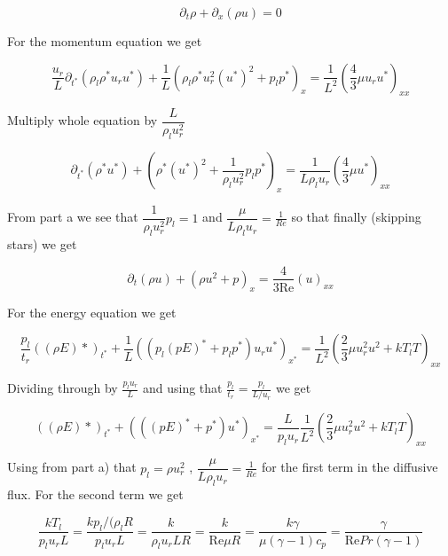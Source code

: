 \documentclass{article}
\renewcommand{\Re}{\text{Re}}
\begin{document}
\begin{equation}
 	\partial_t\rho + \partial_x(\rho u) = 0
\end{equation}

For the momentum equation we get

\begin{equation}
\frac{u_r}{L}\partial_{t^*}(\rho_l\rho^* u_r u^*) + \frac{1}{L}(\rho_l \rho^* u_r^2 (u^*)^2 + p_l p^*)_x = \frac{1}{L^2}(\frac{4}{3}\mu u_r u^*)_{xx}
\end{equation}


Multiply whole equation by $\dfrac{L}{\rho_l u_r^2}$

\begin{equation}
\partial_{t^*}(\rho^*  u^*) + ( \rho^*  (u^*)^2 + \dfrac{1}{\rho_l u_r^2}p_l p^*)_x = \dfrac{1}{L \rho_l u_r}(\frac{4}{3}\mu u^*)_{xx}
\end{equation}

From part a we see that $\dfrac{1}{\rho_l u_r^2}p_l=1$ and $ \dfrac{\mu}{L \rho_l u_r} = \frac{1}{Re}$  so that finally (skipping stars) we get

\begin{equation}
\partial_{t}(\rho  u) + ( \rho  u^2 +  p)_x = \frac{4}{3 \Re}( u)_{xx}
\end{equation}

For the energy equation we get

\begin{equation}
\frac{p_l}{t_r} ((\rho E)*)_{t^*} + \frac{1}{L} ( (p_l(pE)^*+p_l p^*)u_r u^*  )_{x^*} = \frac{1}{L^2} (\frac{2}{3}\mu u_r^2 u^2 + k T_l T)_{xx}
\end{equation}

Dividing through by $\frac{p_l u_r}{L}$ and using that $\frac{p_l}{t_r} = \frac{p_l}{L/u_r}$ we get


\begin{equation}
 ((\rho E)*)_{t^*} +  ( ((pE)^*+p^*)u^*  )_{x^*} = \frac{L}{p_l u_r} \frac{1}{L^2} (\frac{2}{3}\mu u_r^2 u^2 + k T_l T)_{xx}
\end{equation}

Using from part a) that $p_l = \rho u_r^2$ , $ \dfrac{\mu}{L \rho_l u_r} = \frac{1}{Re}$ for the first term in the diffusive flux. For the second term we get

\begin{equation}
\frac{kT_l}{p_l u_r L} =  \frac{k p_l/(\rho_l R}{p_l u_r L} = \frac{k}{\rho_l u_r L R} = \frac{k}{\Re \mu R } = \frac{k\gamma}{\mu (\gamma -1) c_p} = \frac{\gamma}{\Re Pr (\gamma -1)}
\end{equation}
\end{document}
